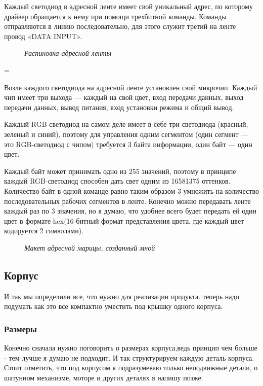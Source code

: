 \documentclass[a4paper, 12pt]{article}
\newcommand{\image}[3]{
	\begin{figure}[ht]
		\center{\texttt{[image: img/\#1]} }
		\caption{\textit{#3}}\end{figure}
}
\begin{document}
Каждый светодиод в адресной ленте имеет свой уникальный адрес, по которому
драйвер обращается к нему при помощи трехбитной команды. Команды отправляются в
линию последовательно, для этого служит третий на ленте провод «DATA INPUT».

\image{лента.jpg}{80}{Распиновка адресной ленты}=

Возле каждого светодиода на адресной ленте установлен свой микрочип.
Каждый чип имеет три выхода — каждый на свой цвет, вход передачи данных,
выход передачи данных, вывод питания, вход установки режима и общий вывод.

Каждый RGB-светодиод на самом деле имеет в себе три светодиода (красный,
зеленый и синий), поэтому для управления одним сегментом (один сегмент — это
RGB-светодиод с чипом) требуется 3 байта информации, один байт — один цвет.

Каждый байт может принимать одно из 255 значений, поэтому в принципе каждый
RGB-светодиод способен дать свет одним из 16581375 оттенков. Количество байт
в одной команде равно таким образом 3 умножить на количество последовательных
рабочих сегментов в ленте. Конечно можно передавать ленте каждый раз по 3
значения, но я думаю, что удобнее всего будет передать ей один цвет в формате
hex(16-битный формат представления цвета, где каждый цвет кодируется 2
символами).


\image{лента в тинкеркад.png}{180}{Макет адресной марицы, созданный мной}

\newpage

\subsection{Корпус}
И так мы определили все, что нужно для реализации продукта.
теперь надо подумать как это все компактно уместить под крышку
одного корпуса.
\subsubsection{Размеры}
Конечно сначала нужно поговорить о размерах корпуса,ведь принцип
чем больше - тем лучше я думаю не подходит. И так структурируем каждую
деталь корпуса. Стоит отметить, что под корпусом я подразумеваю только
неподвижные детали, о шатунном механизме, моторе и других деталях я
напишу позже.
\end{document}
